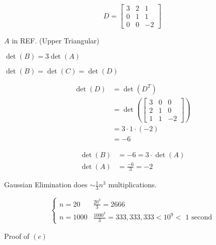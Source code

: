 \documentclass[12pt]{article}
\begin{document}
\begin{equation*}
  D= \begin{bmatrix}
    3 & 2 & 1 \\
    0 & 1 & 1 \\
    0 & 0 & -2
  \end{bmatrix}
\end{equation*}

$A$ in REF. (Upper Triangular)

$\det(B) = 3\det(A)$

$\det(B) = \det(C) = \det(D)$

\begin{align*}
  \det(D) &= \det(D^T)\\
          &= \det(\begin{bmatrix}
    3 & 0 & 0 \\
    2 & 1 & 0 \\
    1 & 1 & -2
  \end{bmatrix})\\
          &= 3 \cdot 1 \cdot (-2) \\
          &= -6
\end{align*}

\begin{align*}
  \det(B) &= -6 = 3 \cdot \det(A) \\
  \det(A) &= \frac{-6}{3} = -2
\end{align*}

Gaussian Elimination does $\sim \frac{1}{3} n^3$ multiplications.

\[
  \begin{cases}
    n=20 & \frac{20^3}{3} = 2666\\
    n=1000 & \frac{1000^3}{3} = 333,333,333 < 10^9 < \text{ 1 second}
  \end{cases}
\]

Proof of $(c)$
\end{document}
